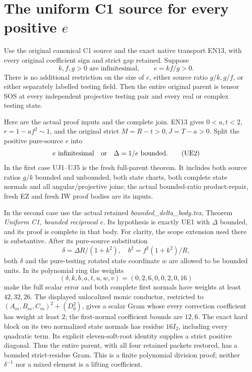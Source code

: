 \section{The uniform C1 source for every positive \(e\)}
\label{sec:uniform-c1-all-e-rederived}

Use the original canonical C1 source and the exact native transport
EN13, with every original coefficient sign and strict gap retained.
Suppose
\[
 k,f,g>0\text{ are infinitesimal},\qquad e=kf/g>0 .
 \tag{UE1}
\]
There is no additional restriction on the size of \(e\), either
source ratio \(g/k,g/f\), or either separately labelled testing field.
Then the entire original parent is tensor SOS at every independent
projective testing pair and every real or complex testing state.

Here are the actual proof inputs and the complete join.  EN13 gives
\(0<a,t<2\), \(r=1-af^2\sim1\), and the original strict
\(M=R-t>0,J=T-a>0\).  Split the positive pure-source \(e\) into
\[
 e\text{ infinitesimal}\quad\hbox{or}\quad \Delta=1/e\text{ bounded}.
 \tag{UE2}
\]
In the first case UJ1--UJ5 is the fresh full-parent theorem.  It
includes both source ratios \(g/k\) bounded and unbounded, both
state charts, both complete state normals and all angular/projective
joins; the actual bounded-ratio product-repair, fresh EZ and fresh
IW proof bodies are its inputs.

In the second case use the actual retained
\emph{bounded\_delta\_body.tex}, Theorem \emph{Uniform C1, bounded
reciprocal \(e\)}.  Its hypothesis is exactly UE1 with
\(\Delta\) bounded, and its proof is complete in that body.
For clarity, the scope extension used there is substantive.
After its pure-source substitution
\[
 \delta=\Delta R/(1+k^2),\quad b^2=f^2(1+k^2)/R,
\]
both \(\delta\) and the pure-testing rotated state coordinate \(w\)
are allowed to be bounded units.  In its polynomial ring the weights
\[
 (\delta,k,b,a,t,u,w,v)=(0,2,6,0,0,2,0,16)
 \tag{UE3}
\]
make the full scalar error and both complete first normals have weights
at least \(42,32,26\).  The displayed unlocalized monic conductor,
restricted to \((A_m,B_m,C_m)^2+(D_0^2)\), gives a scalar Gram
whose every correction coefficient has weight at least \(2\);
the first-normal coefficient bounds are \(12,6\).
The exact hard block on its two normalized state normals has
residue \(16I_2\), including every quadratic term.  Its explicit
eleven-soft-root identity supplies a strict positive diagonal.
Thus the entire parent, with all four retained packets restored,
has a bounded strict-residue Gram.  This is a finite polynomial
division proof; neither \(\delta^{-1}\) nor a mixed element is a
lifting coefficient.

